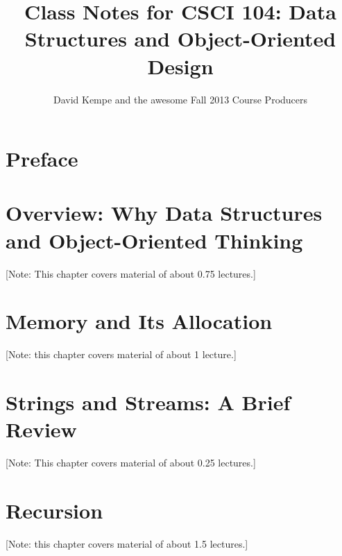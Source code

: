 \documentclass{book}
\title{Class Notes for CSCI 104: Data Structures and Object-Oriented Design}
\author{David Kempe and the awesome Fall 2013 Course Producers}
\begin{document}


\begin{titlepage}
\maketitle
\end{titlepage}


\chapter*{Preface}
\label{chap:preface}




\tableofcontents

\chapter{Overview: Why Data Structures and Object-Oriented Thinking}
\label{chap:overview}
[Note: This chapter covers material of about 0.75 lectures.]


%

\chapter{Memory and Its Allocation}
\label{chap:dynamic-memory}
[Note: this chapter covers material of about 1 lecture.]


%

\chapter{Strings and Streams: A Brief Review}
\label{chap:strings-streams}
[Note: This chapter covers material of about 0.25 lectures.]


% 

\chapter{Recursion}
\label{chap:recursion}
[Note: this chapter covers material of about 1.5 lectures.]
\end{document}
